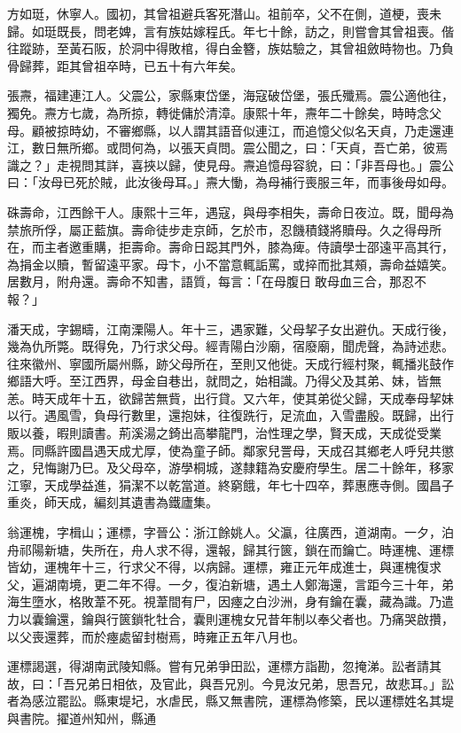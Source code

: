\begin{pinyinscope}
方如珽，休寧人。國初，其曾祖避兵客死潛山。祖前卒，父不在側，道梗，喪未歸。如珽既長，問老婢，言有族姑嫁程氏。年七十餘，訪之，則嘗會其曾祖喪。偕往蹤跡，至黃石阪，於洞中得敗棺，得白金簪，族姑驗之，其曾祖斂時物也。乃負骨歸葬，距其曾祖卒時，已五十有六年矣。

張燾，福建連江人。父震公，家縣東岱堡，海寇破岱堡，張氏殲焉。震公適他往，獨免。燾方七歲，為所掠，轉徙傭於清漳。康熙十年，燾年二十餘矣，時時念父母。顧被掠時幼，不審鄉縣，以人謂其語音似連江，而追憶父似名天貞，乃走還連江，數日無所鄉。或問何為，以張天貞問。震公聞之，曰：「天貞，吾亡弟，彼焉識之？」走視問其詳，喜挾以歸，使見母。燾追憶母容貌，曰：「非吾母也。」震公曰：「汝母已死於賊，此汝後母耳。」燾大慟，為母補行喪服三年，而事後母如母。

硃壽命，江西餘干人。康熙十三年，遇寇，與母李相失，壽命日夜泣。既，聞母為禁旅所俘，屬正藍旗。壽命徒步走京師，乞於市，忍饑積錢將贖母。久之得母所在，而主者邀重購，拒壽命。壽命日跽其門外，膝為痺。侍讀學士邵遠平高其行，為捐金以贖，暫留遠平家。母卞，小不當意輒詬罵，或捽而批其頰，壽命益嬉笑。居數月，附舟還。壽命不知書，語質，每言：「在母腹日敢母血三合，那忍不報？」

潘天成，字錫疇，江南溧陽人。年十三，遇家難，父母挈子女出避仇。天成行後，幾為仇所斃。既得免，乃行求父母。經青陽白沙廟，宿廢廟，聞虎聲，為詩述悲。往來徽州、寧國所屬州縣，跡父母所在，至則又他徙。天成行經村聚，輒播兆鼓作鄉語大呼。至江西界，母金自巷出，就問之，始相識。乃得父及其弟、妹，皆無恙。時天成年十五，欲歸苦無貲，出行貸。又六年，使其弟從父歸，天成奉母挈妹以行。遇風雪，負母行數里，還抱妹，往復跣行，足流血，入雪盡殷。既歸，出行販以養，暇則讀書。荊溪湯之錡出高攀龍門，治性理之學，賢天成，天成從受業焉。同縣許國昌遇天成尤厚，使為童子師。鄰家兒詈母，天成召其鄉老人呼兒共懲之，兒悔謝乃巳。及父母卒，游學桐城，遂隸籍為安慶府學生。居二十餘年，移家江寧，天成學益進，狷潔不以乾當道。終窮餓，年七十四卒，葬惠應寺側。國昌子重炎，師天成，編刻其遺書為鐵廬集。

翁運槐，字楫山；運標，字晉公：浙江餘姚人。父瀛，往廣西，道湖南。一夕，泊舟祁陽新塘，失所在，舟人求不得，還報，歸其行篋，鎖在而鑰亡。時運槐、運標皆幼，運槐年十三，行求父不得，以病歸。運標，雍正元年成進士，與運槐復求父，遍湖南境，更二年不得。一夕，復泊新塘，遇土人鄭海還，言距今三十年，弟海生墮水，格敗葦不死。視葦間有尸，因瘞之白沙洲，身有鑰在囊，藏為識。乃遣力以囊鑰還，鑰與行篋鎖牝牡合，囊則運槐女兄昔年制以奉父者也。乃痛哭啟攢，以父喪還葬，而於瘞處留封樹焉，時雍正五年八月也。

運標謁選，得湖南武陵知縣。嘗有兄弟爭田訟，運標方詣勘，忽掩涕。訟者請其故，曰：「吾兄弟日相依，及官此，與吾兄別。今見汝兄弟，思吾兄，故悲耳。」訟者為感泣罷訟。縣東堤圮，水虐民，縣又無書院，運標為修築，民以運標姓名其堤與書院。擢道州知州，縣通


\end{pinyinscope}
